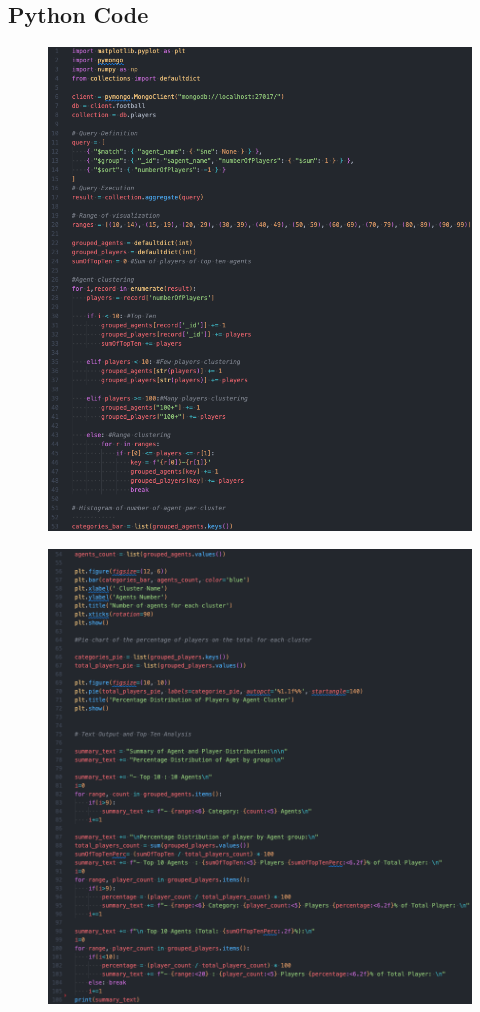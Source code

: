 \documentclass{Configuration_Files/PoliMi3i_thesis}
\begin{document}
\subsection{Python Code}
\begin{figure}[htbp]
  \centering
  \includegraphics[scale=0.5]{Images/Top Football Agents Extra/row_1_53.png}
\end{figure}
\begin{figure}[htbp]
  \centering
  \includegraphics[scale=0.5]{Images/Top Football Agents Extra/row_54_106.png}
\end{figure}
\end{document}
